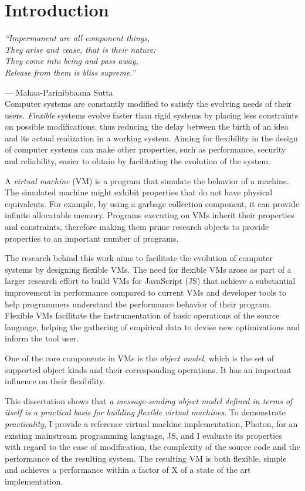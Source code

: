 \chapter{Introduction}

\emph{``Impermanent are all component things,\\
They arise and cease, that is their nature:\\
They come into being and pass away,\\
Release from them is bliss supreme.''} 

--- Mahaa-Parinibbaana Sutta \cite{1988last} \\

Computer systems are constantly modified to satisfy the evolving needs of their
users. \textit{Flexible} systems evolve faster than rigid systems by placing less
constraints on possible modifications, thus reducing the delay between the
birth of an idea and its actual realization in a working system. Aiming for
flexibility in the design of computer systems can make other properties, such as
performance, security and reliability, easier to obtain by facilitating the
evolution of the system.

A \textit{virtual machine} (VM) is a program that simulate the behavior of a
machine.  The simulated machine might exhibit properties that do not have
physical equivalents. For example, by using a garbage collection component, it
can provide infinite allocatable memory. Programs executing on VMs inherit
their properties and constraints, therefore making them prime research objects
to provide properties to an important number of programs.

The research behind this work aims to facilitate the evolution of computer
systems by designing flexible VMs. The need for flexible VMs arose as part of a
larger research effort to build VMs for JavaScript (JS) that achieve a
substantial improvement in performance compared to current VMs and developer
tools to help programmers understand the performance behavior of their program.
Flexible VMs facilitate the instrumentation of basic operations of the source
language, helping the gathering of empirical data to devise new optimizations
and inform the tool user. 

One of the core components in VMs is the \textit{object model}, which is the
set of supported object kinds and their corresponding operations. It has an
important influence on their flexibility.  

This dissertation shows that \textit{a message-sending object model defined in
terms of itself is a practical basis for building flexible virtual machines}.
To demonstrate \textit{practicality}, I provide a reference virtual machine
implementation, Photon, for an existing mainstream programming language,
JS, and I evaluate its properties with regard to the ease of
modification, the complexity of the source code and the performance of the
resulting system. The resulting VM is both flexible, simple and achieves a
performance within a factor of X of a state of the art implementation.

